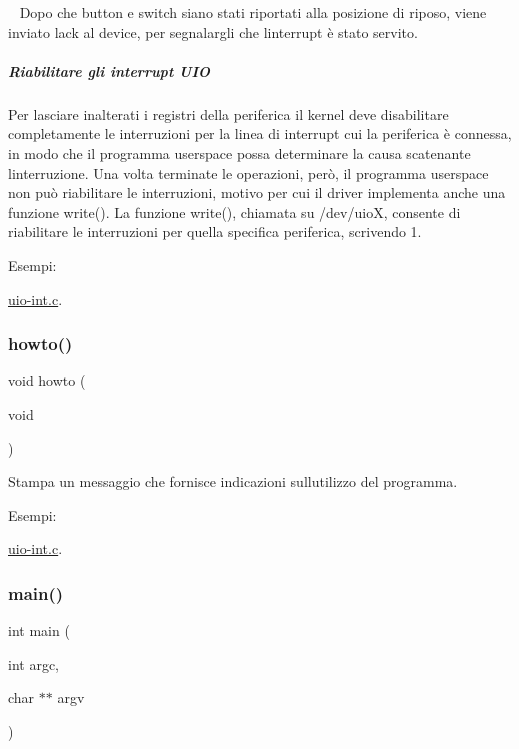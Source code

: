 ~\newline
 Dopo che button e switch siano stati riportati alla posizione di riposo, viene inviato l\textquotesingle{}ack al device, per segnalargli che l\textquotesingle{}interrupt è stato servito.

\subparagraph*{Riabilitare gli interrupt U\+IO}

Per lasciare inalterati i registri della periferica il kernel deve disabilitare completamente le interruzioni per la linea di interrupt cui la periferica è connessa, in modo che il programma userspace possa determinare la causa scatenante l\textquotesingle{}interruzione. Una volta terminate le operazioni, però, il programma userspace non può riabilitare le interruzioni, motivo per cui il driver implementa anche una funzione write(). La funzione write(), chiamata su /dev/uioX, consente di riabilitare le interruzioni per quella specifica periferica, scrivendo 1.\begin{Desc}
\item[Esempi\+: ]\par
\hyperlink{uio-int_8c-example}{uio-\/int.\+c}.\end{Desc}
\mbox{\label{uio-int_8c_a05909651fa170a63e98e3f8e13451b7b}} 
\subsubsection{\texorpdfstring{howto()}{howto()}}
{\footnotesize\ttfamily void howto (\begin{DoxyParamCaption}\item[{void}]{ }\end{DoxyParamCaption})}



Stampa un messaggio che fornisce indicazioni sull\textquotesingle{}utilizzo del programma. 

\begin{Desc}
\item[Esempi\+: ]\par
\hyperlink{uio-int_8c-example}{uio-\/int.\+c}.\end{Desc}
\mbox{\label{uio-int_8c_a3c04138a5bfe5d72780bb7e82a18e627}} 
\subsubsection{\texorpdfstring{main()}{main()}}
{\footnotesize\ttfamily int main (\begin{DoxyParamCaption}\item[{int}]{argc,  }\item[{char $\ast$$\ast$}]{argv }\end{DoxyParamCaption})}



